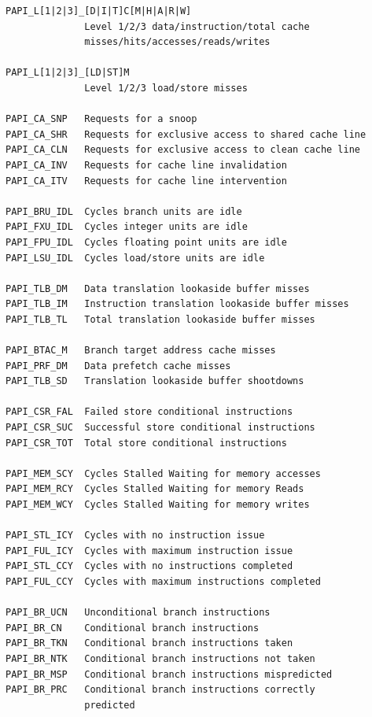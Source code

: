 \documentclass[a4paper,twoside,12pt,BCOR12mm]{scrbook}
\begin{document}
\latex{\begin{small}}
\begin{verbatim}
PAPI_L[1|2|3]_[D|I|T]C[M|H|A|R|W]    
              Level 1/2/3 data/instruction/total cache 
              misses/hits/accesses/reads/writes

PAPI_L[1|2|3]_[LD|ST]M    
              Level 1/2/3 load/store misses                       

PAPI_CA_SNP   Requests for a snoop                                
PAPI_CA_SHR   Requests for exclusive access to shared cache line  
PAPI_CA_CLN   Requests for exclusive access to clean cache line   
PAPI_CA_INV   Requests for cache line invalidation                
PAPI_CA_ITV   Requests for cache line intervention                

PAPI_BRU_IDL  Cycles branch units are idle                        
PAPI_FXU_IDL  Cycles integer units are idle                       
PAPI_FPU_IDL  Cycles floating point units are idle                
PAPI_LSU_IDL  Cycles load/store units are idle                    

PAPI_TLB_DM   Data translation lookaside buffer misses            
PAPI_TLB_IM   Instruction translation lookaside buffer misses     
PAPI_TLB_TL   Total translation lookaside buffer misses           

PAPI_BTAC_M   Branch target address cache misses                  
PAPI_PRF_DM   Data prefetch cache misses                          
PAPI_TLB_SD   Translation lookaside buffer shootdowns             

PAPI_CSR_FAL  Failed store conditional instructions               
PAPI_CSR_SUC  Successful store conditional instructions           
PAPI_CSR_TOT  Total store conditional instructions                

PAPI_MEM_SCY  Cycles Stalled Waiting for memory accesses          
PAPI_MEM_RCY  Cycles Stalled Waiting for memory Reads             
PAPI_MEM_WCY  Cycles Stalled Waiting for memory writes            

PAPI_STL_ICY  Cycles with no instruction issue                    
PAPI_FUL_ICY  Cycles with maximum instruction issue               
PAPI_STL_CCY  Cycles with no instructions completed               
PAPI_FUL_CCY  Cycles with maximum instructions completed          

PAPI_BR_UCN   Unconditional branch instructions                   
PAPI_BR_CN    Conditional branch instructions                     
PAPI_BR_TKN   Conditional branch instructions taken               
PAPI_BR_NTK   Conditional branch instructions not taken           
PAPI_BR_MSP   Conditional branch instructions mispredicted        
PAPI_BR_PRC   Conditional branch instructions correctly
              predicted 


\end{verbatim}
\end{document}
